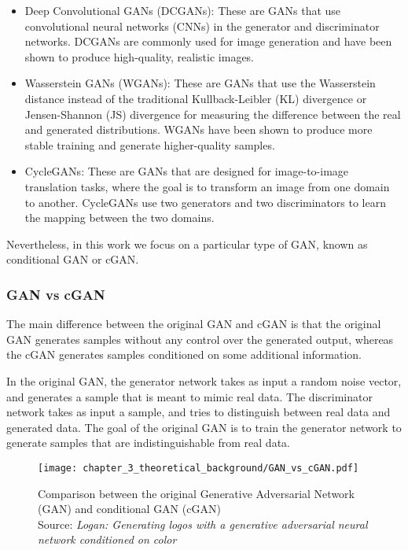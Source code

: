 \begin{itemize}
	\item Deep Convolutional GANs (DCGANs): These are GANs that use convolutional neural networks (CNNs) in the generator and discriminator networks. DCGANs are commonly used for image generation and have been shown to produce high-quality, realistic images.
	\item Wasserstein GANs (WGANs): These are GANs that use the Wasserstein distance instead of the traditional Kullback-Leibler (KL) divergence or Jensen-Shannon (JS) divergence for measuring the difference between the real and generated distributions. WGANs have been shown to produce more stable training and generate higher-quality samples.
	\item CycleGANs: These are GANs that are designed for image-to-image translation tasks, where the goal is to transform an image from one domain to another. CycleGANs use two generators and two discriminators to learn the mapping between the two domains.
\end{itemize}

Nevertheless, in this work we focus on a particular type of GAN, known as conditional GAN or cGAN. %

\subsubsection{GAN vs cGAN}
\label{subsubsec:3_cGAN}

The main difference between the original GAN and cGAN is that the original GAN generates samples without any control over the generated output, whereas the cGAN generates samples conditioned on some additional information.

In the original GAN, the generator network takes as input a random noise vector, and generates a sample that is meant to mimic real data. The discriminator network takes as input a sample, and tries to distinguish between real data and generated data. The goal of the original GAN is to train the generator network to generate samples that are indistinguishable from real data.

\begin{figure}[h]
	\centering
	\texttt{[image: chapter\_3\_theoretical\_background/GAN\_vs\_cGAN.pdf]}
	\caption[Comparison between the original GAN and conditional GAN]{Comparison between the original Generative Adversarial Network (GAN) and conditional GAN (cGAN) \\
	Source: \textit{Logan: Generating logos with a generative adversarial neural network conditioned on color} \cite{mino2018logan}}
	\label{fig:chapter_3_theoretical_background/GAN_vs_cGAN}
\end{figure}

